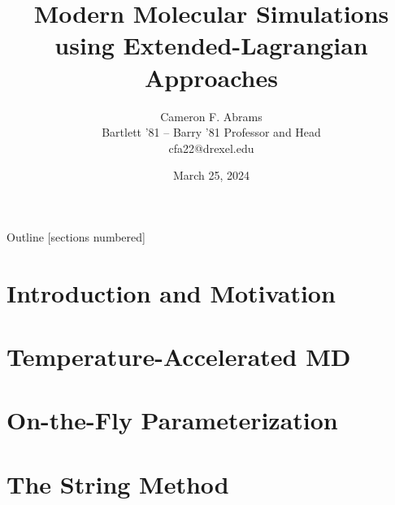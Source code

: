 \documentclass[10pt]{beamer}
\title{Modern Molecular Simulations using Extended-Lagrangian Approaches}
\date{March 25, 2024}
\author{Cameron F. Abrams\\Bartlett '81 -- Barry '81 Professor and Head\\cfa22@drexel.edu}
\institute{Drexel University, Department of Chemical and Biological Engineering}
\begin{document}
\maketitle

\begin{frame}{Outline}
  [sections numbered]
  \tableofcontents[hideallsubsections]
\end{frame}

\section{Introduction and Motivation}











\section{Temperature-Accelerated MD}





\section{On-the-Fly Parameterization}













\section{The String Method}








\end{document}
